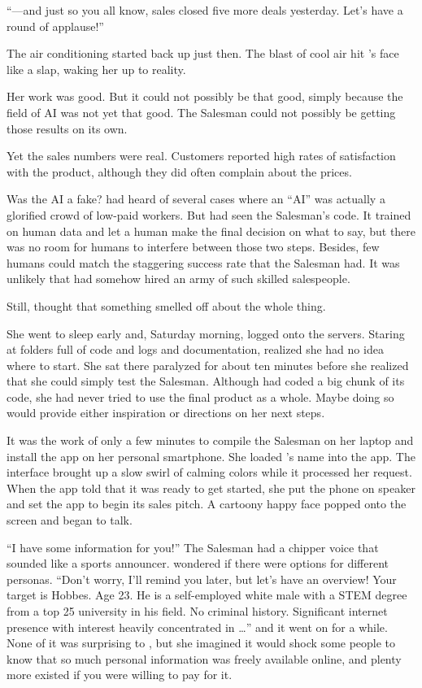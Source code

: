``---and just so you all know, sales closed five more deals yesterday. Let's have a round of applause!''

The air conditioning started back up just then. The blast of cool air hit {\protag}'s face like a slap, waking her up to reality.

Her work was good. But it could not possibly be that good, simply because the field of AI was not yet that good. The Salesman could not possibly be getting those results on its own.

Yet the sales numbers were real. Customers reported high rates of satisfaction with the product, although they did often complain about the prices.

Was the AI a fake? {\protag} had heard of several cases where an ``AI'' was actually a glorified crowd of low-paid workers. But {\protag} had seen the Salesman's code. It trained on human data and let a human make the final decision on what to say, but there was no room for humans to interfere between those two steps. Besides, few humans could match the staggering success rate that the Salesman had. It was unlikely that \energyCompany{} had somehow hired an army of such skilled salespeople.

Still, {\protag} thought that something smelled off about the whole thing.

She went to sleep early and, Saturday morning, logged onto the servers. Staring at folders full of code and logs and documentation, {\protag} realized she had no idea where to start.  She sat there paralyzed for about ten minutes before she realized that she could simply test the Salesman. Although {\protag} had coded a big chunk of its code, she had never tried to use the final product as a whole. Maybe doing so would provide either inspiration or directions on her next steps.

It was the work of only a few minutes to compile the Salesman on her laptop and install the app on her personal smartphone. She loaded {\sidetag}'s name into the app. The interface brought up a slow swirl of calming colors while it processed her request. When the app told {\protag} that it was ready to get started, she put the phone on speaker and set the app to begin its sales pitch. A cartoony happy face popped onto the screen and began to talk.

``I have some information for you!'' The Salesman had a chipper voice that sounded like a sports announcer. {\protag} wondered if there were options for different personas. ``Don't worry, I'll remind you later, but let's have an overview! Your target is {\sidetag} Hobbes. Age 23. He is a self-employed white male with a STEM degree from a top 25 university in his field. No criminal history. Significant internet presence with interest heavily concentrated in \dots'' and it went on for a while. None of it was surprising to {\protag}, but she imagined it would shock some people to know that so much personal information was freely available online, and plenty more existed if you were willing to pay for it.

